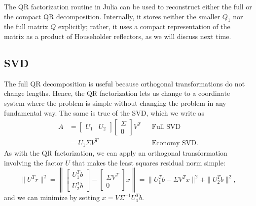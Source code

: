 \documentclass[12pt, leqno]{article} %
\begin{document}
The QR factorization routine in Julia can be used to reconstruct
either the full or the compact QR decomposition.  Internally, it
stores neither the smaller $Q_1$ nor the full matrix $Q$ explicitly;
rather, it uses a compact representation of the matrix as a product of
Householder reflectors, as we will discuss next time.

\subsection{SVD}

The full QR decomposition is useful because orthogonal transformations
do not change lengths.  Hence, the QR factorization lets us change
to a coordinate system where the problem is simple without changing
the problem in any fundamental way.  The same is true of the SVD,
which we write as
\begin{align*}
A &=
\begin{bmatrix} U_1 & U_2 \end{bmatrix}
\begin{bmatrix} \Sigma \\ 0 \end{bmatrix}
V^T & & \mbox{Full SVD} \\
&= U_1 \Sigma V^T & & \mbox{Economy SVD}.
\end{align*}
As with the QR factorization, we can apply an orthogonal
transformation involving the factor $U$ that makes the
least squares residual norm simple:
\[
\|U^T r\|^2 =
\left\| \begin{bmatrix} U_1^T b \\ U_2^T b \end{bmatrix} -
\begin{bmatrix} \Sigma V^T \\ 0 \end{bmatrix} x
\right\| =
\|U_1^T b - \Sigma V^T x\|^2 + \|U_2^T b\|^2,
\]
and we can minimize by setting $x = V \Sigma^{-1} U_1^T b$.
\end{document}
